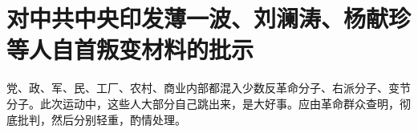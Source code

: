 \section[对中共中央印发薄一波、刘澜涛、杨献珍等人自首叛变材料的批示（一九六七年三月十六日）]{对中共中央印发薄一波、刘澜涛、杨献珍等人自首叛变材料的批示}


党、政、军、民、工厂、农村、商业内部都混入少数反革命分子、右派分子、变节分子。此次运动中，这些人大部分自己跳出来，是大好事。应由革命群众查明，彻底批判，然后分别轻重，酌情处理。


